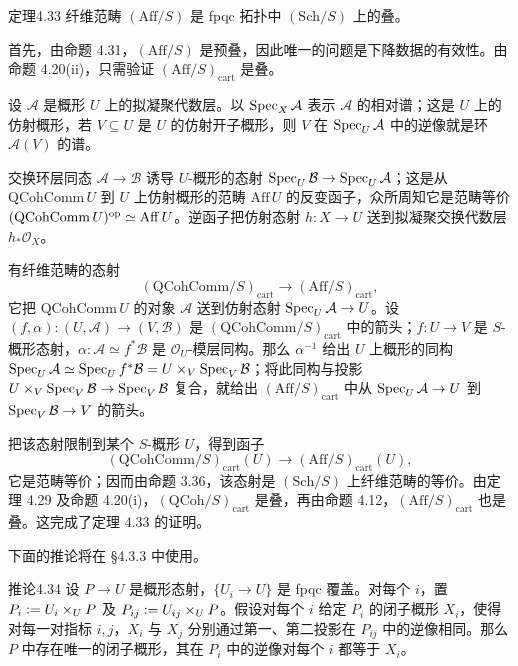 \begin{origstatement}{定理}{4.33}\label{ch04:thm433}
纤维范畴 $(\mathrm{Aff}/S)$ 是 fpqc 拓扑中 $(\mathrm{Sch}/S)$ 上的叠。
\end{origstatement}
首先，由命题 4.31，$(\mathrm{Aff}/S)$ 是预叠，因此唯一的问题是下降数据的有效性。由命题 4.20(ii)，只需验证 $(\mathrm{Aff}/S)_{\mathrm{cart}}$ 是叠。

设 $\mathcal A$ 是概形 $U$ 上的拟凝聚代数层。以 $\operatorname{Spec}_X\mathcal A$ 表示 $\mathcal A$ 的相对谱；这是 $U$ 上的仿射概形，若 $V\subseteq U$ 是 $U$ 的仿射开子概形，则 $V$ 在 $\operatorname{Spec}_U\mathcal A$ 中的逆像就是环 $\mathcal A(V)$ 的谱。

交换环层同态 $\mathcal A\to\mathcal B$ 诱导 $U$-概形的态射 $\operatorname{Spec}_U\mathcal B\to\operatorname{Spec}_U\mathcal A$；这是从 $\mathrm{QCohComm}\,U$ 到 $U$ 上仿射概形的范畴 $\mathrm{Aff}\,U$ 的反变函子，众所周知它是范畴等价 $(\mathrm{QCohComm}\,U)^{\mathrm{op}}\simeq\mathrm{Aff}\,U$。逆函子把仿射态射 $h\colon X\to U$ 送到拟凝聚交换代数层 $h_*\mathcal O_X$。

有纤维范畴的态射
\[
 (\mathrm{QCohComm}/S)_{\mathrm{cart}}\longrightarrow(\mathrm{Aff}/S)_{\mathrm{cart}},
\]
它把 $\mathrm{QCohComm}\,U$ 的对象 $\mathcal A$ 送到仿射态射 $\operatorname{Spec}_U\mathcal A\to U$。设 $(f,\alpha)\colon(U,\mathcal A)\to(V,\mathcal B)$ 是 $(\mathrm{QCohComm}/S)_{\mathrm{cart}}$ 中的箭头；$f\colon U\to V$ 是 $S$-概形态射，$\alpha\colon\mathcal A\simeq f^*\mathcal B$ 是 $\mathcal O_U$-模层同构。那么 $\alpha^{-1}$ 给出 $U$ 上概形的同构
$\operatorname{Spec}_U\mathcal A\simeq\operatorname{Spec}_U f^*\mathcal B=U\times_V\operatorname{Spec}_V\mathcal B$；将此同构与投影 $U\times_V\operatorname{Spec}_V\mathcal B\to\operatorname{Spec}_V\mathcal B$ 复合，就给出 $(\mathrm{Aff}/S)_{\mathrm{cart}}$ 中从 $\operatorname{Spec}_U\mathcal A\to U$ 到 $\operatorname{Spec}_V\mathcal B\to V$ 的箭头。

把该态射限制到某个 $S$-概形 $U$，得到函子
\[
 (\mathrm{QCohComm}/S)_{\mathrm{cart}}(U)\longrightarrow(\mathrm{Aff}/S)_{\mathrm{cart}}(U),
\]
它是范畴等价；因而由命题 3.36，该态射是 $(\mathrm{Sch}/S)$ 上纤维范畴的等价。由定理 4.29 及命题 4.20(i)，$(\mathrm{QCoh}/S)_{\mathrm{cart}}$ 是叠，再由命题 4.12，$(\mathrm{Aff}/S)_{\mathrm{cart}}$ 也是叠。这完成了定理 4.33 的证明。

下面的推论将在 §4.3.3 中使用。

\begin{origstatement}{推论}{4.34}\label{ch04:cor434}
设 $P\to U$ 是概形态射，$\{U_i\to U\}$ 是 fpqc 覆盖。对每个 $i$，置 $P_i\mathrel{\mathop:}= U_i\times_U P$ 及 $P_{ij}\mathrel{\mathop:}= U_{ij}\times_U P$。假设对每个 $i$ 给定 $P_i$ 的闭子概形 $X_i$，使得对每一对指标 $i,j$，$X_i$ 与 $X_j$ 分别通过第一、第二投影在 $P_{ij}$ 中的逆像相同。那么 $P$ 中存在唯一的闭子概形，其在 $P_i$ 中的逆像对每个 $i$ 都等于 $X_i$。
\end{origstatement}

